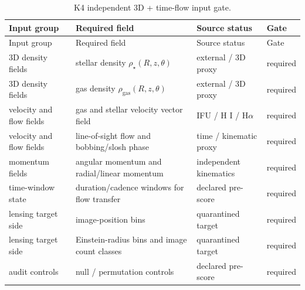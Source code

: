 \scriptsize
\begin{longtable}{@{}p{}p{}p{}p{}@{}}
\caption{K4 independent 3D + time-flow input gate.}\label{tab:manual-lensing-k4-gate}\\
\toprule
Input group & Required field & Source status & Gate\\
\midrule
\endfirsthead
\toprule
Input group & Required field & Source status & Gate\\
\midrule
\endhead
3D density fields & stellar density \(\rho_\star(R,z,\theta)\) & external / 3D proxy & required\\
3D density fields & gas density \(\rho_{\mathrm{gas}}(R,z,\theta)\) & external / 3D proxy & required\\
velocity and flow fields & gas and stellar velocity vector field & IFU / H I / H\(\alpha\) & required\\
velocity and flow fields & line-of-sight flow and bobbing/slosh phase & time / kinematic proxy & required\\
momentum fields & angular momentum and radial/linear momentum & independent kinematics & required\\
time-window state & duration/cadence windows for flow transfer & declared pre-score & required\\
lensing target side & image-position bins & quarantined target & required\\
lensing target side & Einstein-radius bins and image count classes & quarantined target & required\\
audit controls & null / permutation controls & declared pre-score & required\\
\bottomrule
\end{longtable}
\normalsize
